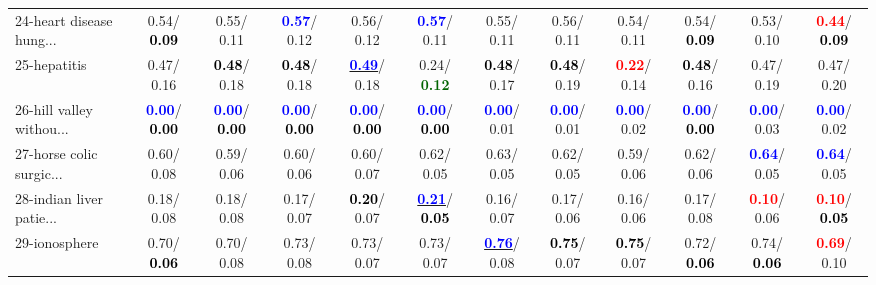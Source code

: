 \begin{table}[h]
\begin{center}
{\begin{tabular}{lc|c|c|c|c|c|c|c|c|c|c}
24-heart disease hung... &   0.54/\textcolor{black}{\textbf{  0.09}} &   0.55/  0.11 & \textcolor{blue}{\textbf{  0.57}}/  0.12 &   0.56/  0.12 & \textcolor{blue}{\textbf{  0.57}}/  0.11 &   0.55/  0.11 &   0.56/  0.11 &   0.54/  0.11 &   0.54/\textcolor{black}{\textbf{  0.09}} &   0.53/  0.10 & \textcolor{red}{\textbf{  0.44}}/\textcolor{black}{\textbf{  0.09}} \\
25-hepatitis &   0.47/  0.16 & \textcolor{black}{\textbf{  0.48}}/  0.18 & \textcolor{black}{\textbf{  0.48}}/  0.18 & \underline{\textcolor{blue}{\textbf{  0.49}}}/  0.18 &   0.24/\textcolor{darkgreen}{\textbf{  0.12}} & \textcolor{black}{\textbf{  0.48}}/  0.17 & \textcolor{black}{\textbf{  0.48}}/  0.19 & \textcolor{red}{\textbf{  0.22}}/  0.14 & \textcolor{black}{\textbf{  0.48}}/  0.16 &   0.47/  0.19 &   0.47/  0.20 \\
26-hill valley withou... & \textcolor{blue}{\textbf{  0.00}}/\textcolor{black}{\textbf{  0.00}} & \textcolor{blue}{\textbf{  0.00}}/\textcolor{black}{\textbf{  0.00}} & \textcolor{blue}{\textbf{  0.00}}/\textcolor{black}{\textbf{  0.00}} & \textcolor{blue}{\textbf{  0.00}}/\textcolor{black}{\textbf{  0.00}} & \textcolor{blue}{\textbf{  0.00}}/\textcolor{black}{\textbf{  0.00}} & \textcolor{blue}{\textbf{  0.00}}/  0.01 & \textcolor{blue}{\textbf{  0.00}}/  0.01 & \textcolor{blue}{\textbf{  0.00}}/  0.02 & \textcolor{blue}{\textbf{  0.00}}/\textcolor{black}{\textbf{  0.00}} & \textcolor{blue}{\textbf{  0.00}}/  0.03 & \textcolor{blue}{\textbf{  0.00}}/  0.02 \\
27-horse colic surgic... &   0.60/  0.08 &   0.59/  0.06 &   0.60/  0.06 &   0.60/  0.07 &   0.62/  0.05 &   0.63/  0.05 &   0.62/  0.05 &   0.59/  0.06 &   0.62/  0.06 & \textcolor{blue}{\textbf{  0.64}}/  0.05 & \textcolor{blue}{\textbf{  0.64}}/  0.05 \\
28-indian liver patie... &   0.18/  0.08 &   0.18/  0.08 &   0.17/  0.07 & \textcolor{black}{\textbf{  0.20}}/  0.07 & \underline{\textcolor{blue}{\textbf{  0.21}}}/\textcolor{black}{\textbf{  0.05}} &   0.16/  0.07 &   0.17/  0.06 &   0.16/  0.06 &   0.17/  0.08 & \textcolor{red}{\textbf{  0.10}}/  0.06 & \textcolor{red}{\textbf{  0.10}}/\textcolor{black}{\textbf{  0.05}} \\ \hline
29-ionosphere &   0.70/\textcolor{black}{\textbf{  0.06}} &   0.70/  0.08 &   0.73/  0.08 &   0.73/  0.07 &   0.73/  0.07 & \underline{\textcolor{blue}{\textbf{  0.76}}}/  0.08 & \textcolor{black}{\textbf{  0.75}}/  0.07 & \textcolor{black}{\textbf{  0.75}}/  0.07 &   0.72/\textcolor{black}{\textbf{  0.06}} &   0.74/\textcolor{black}{\textbf{  0.06}} & \textcolor{red}{\textbf{  0.69}}/  0.10 \\

\end{tabular}}
\end{center}
\end{table}
